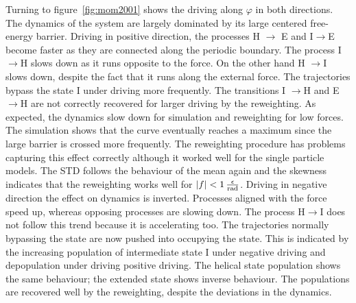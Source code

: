 Turning to figure~\ref{fig:mom2001} shows the driving along $\varphi$ in both directions. The dynamics of the system are largely dominated by its large centered free-energy barrier. Driving in positive direction, the processes H $\rightarrow$ E and I$\rightarrow$E become faster as they are connected along the periodic boundary.  The process I$\rightarrow$H slows down as it runs opposite to the force. On the other hand H $\rightarrow$I slows down, despite the fact that it runs along the external force. The trajectories bypass the state I under driving more frequently. The transitions I $\rightarrow$H and E $\rightarrow$H are not correctly recovered for larger driving by the reweighting. As expected, the dynamics slow down for simulation and reweighting for low forces. The simulation shows that the curve eventually reaches a maximum since the large barrier is crossed more frequently.  The reweighting procedure has problems capturing this effect correctly although it worked well for the single particle models. The STD follows the behaviour of the mean again and the skewness indicates that the reweighting works well for $|f|  <1\,\frac{\epsilon}{{\footnotesize\text{rad}}}$. Driving in negative direction the effect on dynamics is inverted. Processes aligned with the force speed up, whereas opposing processes are slowing down. The process H$\rightarrow$I does not follow this trend because it is accelerating too. The trajectories normally bypassing the state are now pushed into occupying the state. This is indicated by the increasing population of intermediate state I under negative driving  and depopulation under driving positive driving. The helical state population shows the same behaviour; the extended state shows inverse behaviour. The populations are recovered well by the reweighting, despite the deviations in the dynamics.  


